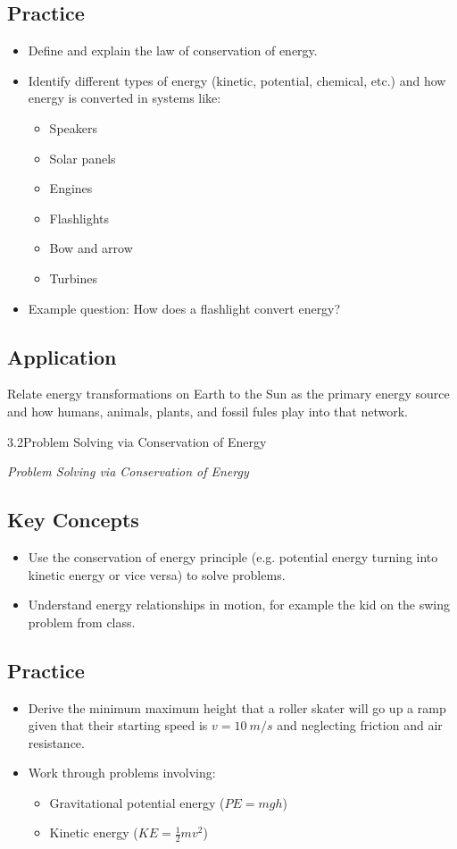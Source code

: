 \documentclass[11pt,addpoints,letterpaper]{exam}
\newcommand{\standardBox}[2]{%
    \begin{learningStandardBox}{#1}{#2} %
        \begin{minipage}[t]{0.5\textwidth} %
            \textit{#2} %
        \end{minipage}%
        \hfill
        \begin{minipage}[t]{0.25\textwidth} %
        \end{minipage}%
        \hfill
        \begin{minipage}[t]{0.2\textwidth} %
            \textbf{} \phantom{1.2cm}
        \end{minipage}
    \end{learningStandardBox}
}
\begin{document}
\subsection*{Practice}
\begin{itemize}
    \item Define and explain the law of conservation of energy.
    \item Identify different types of energy (kinetic, potential, chemical, etc.) and how energy is converted in systems like:
    \begin{itemize}
        \item Speakers
        \item Solar panels
        \item Engines
        \item Flashlights
        \item Bow and arrow
        \item Turbines
    \end{itemize}
    \item Example question: How does a flashlight convert energy?
\end{itemize}

\subsection*{Application}
Relate energy transformations on Earth to the Sun as the primary energy source and how humans, animals, plants, and fossil fules play into that network. 


\pagebreak

\standardBox{3.2}{Problem Solving via Conservation of Energy}
\subsection*{Key Concepts}
\begin{itemize}
    \item Use the conservation of energy principle (e.g. potential energy turning into kinetic energy or vice versa) to solve problems.
    \item Understand energy relationships in motion, for example the kid on the swing problem from class.
\end{itemize}

\subsection*{Practice}
\begin{itemize}
    \item Derive the minimum maximum height that a roller skater will go up a ramp given that their starting speed is $v=\SI{10}{m/s}$ and neglecting friction and air resistance.
    \item Work through problems involving:
    \begin{itemize}
        \item Gravitational potential energy ($PE = mgh$)
        \item Kinetic energy ($KE = \frac{1}{2}mv^2$)
    \end{itemize}
\end{itemize}
\end{document}
